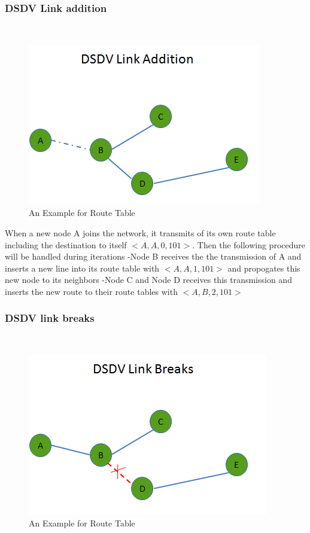 \subsubsection{DSDV Link addition}\hspace{0pt} \\
\begin{figure}[H]
\caption{An Example for Route Table}
\centering
\includegraphics[scale = 0.65]{link_add}
\end{figure}	

When a new node A joins the network, it transmits of its own route table including the destination to itself $<A,A,0,101>$. Then the following procedure will be handled during iterations
	-Node B receives the the transmission of A and inserts a new line into its route table with $<A,A,1,101>$ and propogates this new node to its neighbors
	-Node C and Node D receives this transmission and inserts the new route to their route tables with $<A,B,2,101>$
		
\subsubsection{DSDV link breaks}\hspace{0pt} \\
	
\begin{figure}[H]
\caption{An Example for Route Table}
\centering
\includegraphics[scale = 0.65]{link_break}
\end{figure}

